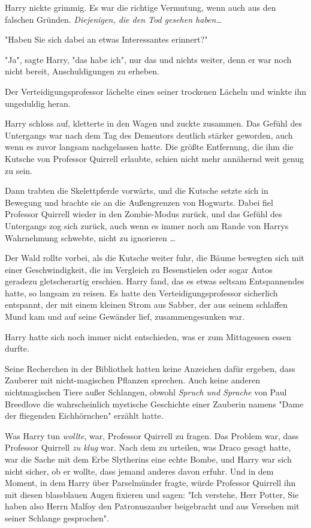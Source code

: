 {Harry nickte grimmig. Es war die richtige Vermutung, wenn auch aus den falschen Gründen. \emph{Diejenigen, die den Tod gesehen haben…}

"Haben Sie sich dabei an etwas Interessantes erinnert?"

"Ja", sagte Harry, "das habe ich", nur das und nichts weiter, denn er war noch nicht bereit, Anschuldigungen zu erheben.

Der Verteidigungsprofessor lächelte eines seiner trockenen Lächeln und winkte ihn ungeduldig heran.

Harry schloss auf, kletterte in den Wagen und zuckte zusammen. Das Gefühl des Untergangs war nach dem Tag des Dementors deutlich stärker geworden, auch wenn es zuvor langsam nachgelassen hatte. Die größte Entfernung, die ihm die Kutsche von Professor Quirrell erlaubte, schien nicht mehr annähernd weit genug zu sein.

Dann trabten die Skelettpferde vorwärts, und die Kutsche setzte sich in Bewegung und brachte sie an die Außengrenzen von Hogwarts. Dabei fiel Professor Quirrell wieder in den Zombie-Modus zurück, und das Gefühl des Untergangs zog sich zurück, auch wenn es immer noch am Rande von Harrys Wahrnehmung schwebte, nicht zu ignorieren …

Der Wald rollte vorbei, als die Kutsche weiter fuhr, die Bäume bewegten sich mit einer Geschwindigkeit, die im Vergleich zu Besenstielen oder sogar Autos geradezu gletscherartig erschien. Harry fand, das es etwas seltsam Entspannendes hatte, so langsam zu reisen. Es hatte den Verteidigungsprofessor sicherlich entspannt, der mit einem kleinen Strom aus Sabber, der aus seinem schlaffen Mund kam und auf seine Gewänder lief, zusammengesunken war.

Harry hatte sich noch immer nicht entschieden, was er zum Mittagessen essen durfte.

Seine Recherchen in der Bibliothek hatten keine Anzeichen dafür ergeben, dass Zauberer mit nicht-magischen Pflanzen sprechen. Auch keine anderen nichtmagischen Tiere außer Schlangen, obwohl \emph{Spruch und Sprache} von Paul Breedlove die wahrscheinlich mystische Geschichte einer Zauberin namens "Dame der fliegenden Eichhörnchen" erzählt hatte.

Was Harry tun \emph{wollte}, war, Professor Quirrell zu fragen. Das Problem war, dass Professor Quirrell \emph{zu klug} war. Nach dem zu urteilen, was Draco gesagt hatte, war die Sache mit dem Erbe Slytherins eine echte Bombe, und Harry war sich nicht sicher, ob er wollte, dass jemand anderes davon erfuhr. Und in dem Moment, in dem Harry über Parselmünder fragte, würde Professor Quirrell ihn mit diesen blassblauen Augen fixieren und sagen: "Ich verstehe, Herr Potter, Sie haben also Herrn Malfoy den Patronuszauber beigebracht und aus Versehen mit seiner Schlange gesprochen".

}
